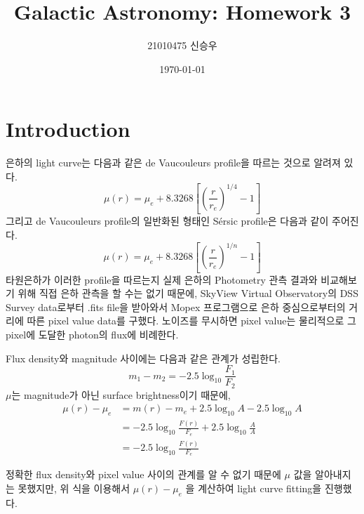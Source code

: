 \documentclass{article}
\title{Galactic Astronomy: Homework 3}
\author{21010475 신승우}
\date{\today} %
\begin{document}
\maketitle %

\section{Introduction}

\quad 은하의 light curve는 다음과 같은 de Vaucouleurs profile을 따르는 것으로 알려져 있다.
\begin{equation}
    \mu(r) = \mu_{e}+8.3268\left[\left(\frac{r}{r_{e}}\right)^{1/4}-1\right]
\end{equation}
\quad 그리고 de Vaucouleurs profile의 일반화된 형태인 Sérsic profile은 다음과 같이 주어진다.
\begin{equation}
    \mu(r) = \mu_{e}+8.3268\left[\left(\frac{r}{r_{e}}\right)^{1/n}-1\right]
\end{equation}
\quad 타원은하가 이러한 profile을 따르는지 실제 은하의 Photometry 관측 결과와 
비교해보기 위해 직접 은하 관측을 할 수는 없기 때문에, 
SkyView Virtual Observatory의 DSS Survey data로부터 .fits file을 받아와서 
Mopex 프로그램으로 은하 중심으로부터의 거리에 따른 pixel value data를 구했다.
노이즈를 무시하면 pixel value는 물리적으로 그 pixel에 도달한 photon의 flux에 비례한다. 

\quad Flux density와 magnitude 사이에는 다음과 같은 관계가 성립한다.
\begin{equation}
    m_1-m_2=-2.5\log_{10}\frac{F_1}{F_2}
\end{equation}
$\mu$는 magnitude가 아닌 surface brightness이기 때문에,
\begin{align*}
    \mu(r)-\mu_e&=m(r)-m_e+2.5\log_{10}A-2.5\log_{10}A\\
    &=-2.5\log_{10}\frac{F(r)}{F_e}+2.5\log_{10}\frac{A}{A} \tag{4}\\
    &=-2.5\log_{10}\frac{F(r)}{F_e}
\end{align*}

\quad 정확한 flux density와 pixel value 사이의 관계를 알 수 없기 때문에 
$\mu$ 값을 알아내지는 못했지만, 위 식을 이용해서 $\mu(r)-\mu_e$ 을 계산하여
light curve fitting을 진행했다.
\end{document}
